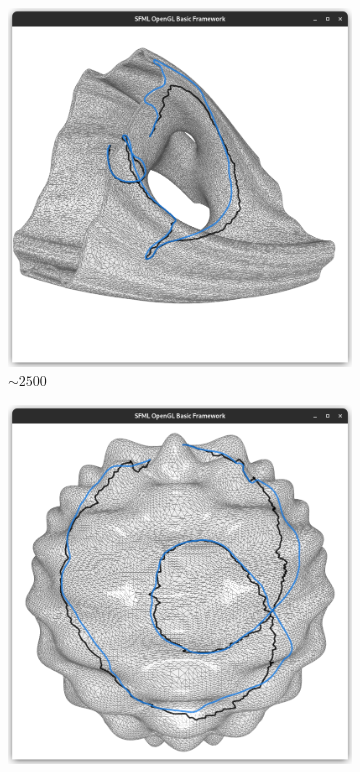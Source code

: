 \documentclass{stdlocal}
\begin{document}
\begin{figure}
  \begin{subfigure}[b]{0.24\linewidth}
    \centering
    \includegraphics[width=\linewidth,trim={15px 20 15 50},clip]{images/julia-smooth-0.95.png}
    \caption{$\sim 2500$}
  \end{subfigure}
  \begin{subfigure}[b]{0.24\linewidth}
    \centering
    \includegraphics[width=\linewidth,trim={15px 20 15 50},clip]{images/harmonic-smooth-0.95.png}

\end{subfigure}
\end{figure}
\end{document}
